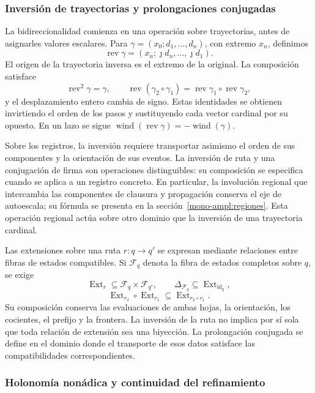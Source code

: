 \subsubsection{Inversión de trayectorias y prolongaciones conjugadas}
\label{tpk-int:bidireccionalidad}

La bidireccionalidad comienza en una operación sobre trayectorias, antes
de asignarles valores escalares. Para
\(\gamma=(x_0;d_1,\ldots,d_n)\), con extremo \(x_n\), definimos
\[
 \operatorname{rev}\gamma
   =(x_n;\jmath d_n,\ldots,\jmath d_1).
\]
El origen de la trayectoria inversa es el extremo de la original.
La composición satisface
\[
 \operatorname{rev}^2\gamma=\gamma,\qquad
 \operatorname{rev}(\gamma_2\circ\gamma_1)
   =\operatorname{rev}\gamma_1\circ\operatorname{rev}\gamma_2,
\]
y el desplazamiento entero cambia de signo. Estas identidades se obtienen
invirtiendo el orden de los pasos y sustituyendo cada vector cardinal por
su opuesto. En un lazo se sigue
\(\operatorname{wind}(\operatorname{rev}\gamma)
=-\operatorname{wind}(\gamma)\).

Sobre los registros, la inversión requiere transportar asimismo el orden
de sus componentes y la orientación de sus eventos. La inversión de
ruta y una conjugación de firma son operaciones distinguibles: su
composición se especifica cuando se aplica a un registro concreto. En
particular, la involución regional que intercambia las componentes de
clausura y propagación conserva el eje de autoescala; su fórmula se
presenta en la sección~\ref{mono-ampl:regiones}. Esta operación regional
actúa sobre otro dominio que la inversión de una trayectoria cardinal.

Las extensiones sobre una ruta \(r:q\to q'\) se expresan mediante
relaciones entre fibras de estados compatibles. Si \(\mathcal F_q\)
denota la fibra de estados completos sobre \(q\), se exige
\[
 \operatorname{Ext}_r\subseteq\mathcal F_q\times\mathcal F_{q'},
 \qquad \Delta_{\mathcal F_q}\subseteq
        \operatorname{Ext}_{\operatorname{id}_q},
\]
\[
 \operatorname{Ext}_{r_2}\circ\operatorname{Ext}_{r_1}
       \subseteq\operatorname{Ext}_{r_2\circ r_1}.
\]
Su composición conserva las evaluaciones de ambas hojas, la orientación,
los cocientes, el prefijo y la frontera. La inversión de la ruta no
implica por sí sola que toda relación de extensión sea una biyección.
La prolongación conjugada se define en el dominio donde el transporte de
esos datos satisface las compatibilidades correspondientes.

\subsubsection{Holonomía nonádica y continuidad del refinamiento}
\label{tpk-int:holonomia}

